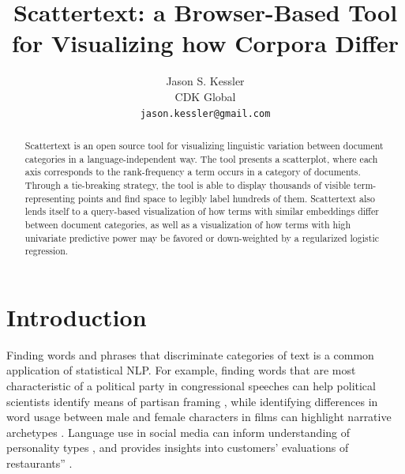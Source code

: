 \documentclass[11pt,a4paper]{article}
\title{Scattertext: a Browser-Based Tool for Visualizing how Corpora Differ}
\author{Jason S. Kessler \\
  CDK Global \\
  {\tt jason.kessler@gmail.com}  \\}
\date{}
\begin{document}
\maketitle
\begin{abstract}
Scattertext is an open source tool for visualizing linguistic variation between document categories in a language-independent way. The tool presents a scatterplot, where each axis corresponds to the rank-frequency a term occurs in a category of documents.  Through a tie-breaking strategy, the tool is able to display thousands of visible term-representing points and find space to legibly label hundreds of them.   Scattertext also lends itself to a query-based visualization of how terms with similar embeddings differ between document categories, as well as a visualization of how terms with high univariate predictive power may be favored or down-weighted by a regularized logistic regression. 
\end{abstract}
\section{Introduction}
Finding words and phrases that discriminate categories of text is a common application of statistical NLP. For example, finding words that are most characteristic of a political party in congressional speeches can help political scientists identify means of partisan framing \cite{monroe08,grimmer2010}, while identifying differences in word usage between male and female characters in films can highlight narrative archetypes \cite{schofield2016gender}.  Language use in social media can inform understanding of personality types \cite{Schwartz13}, and provides insights into customers' evaluations of restaurants” \cite{jurafsky2014}.
\end{document}
